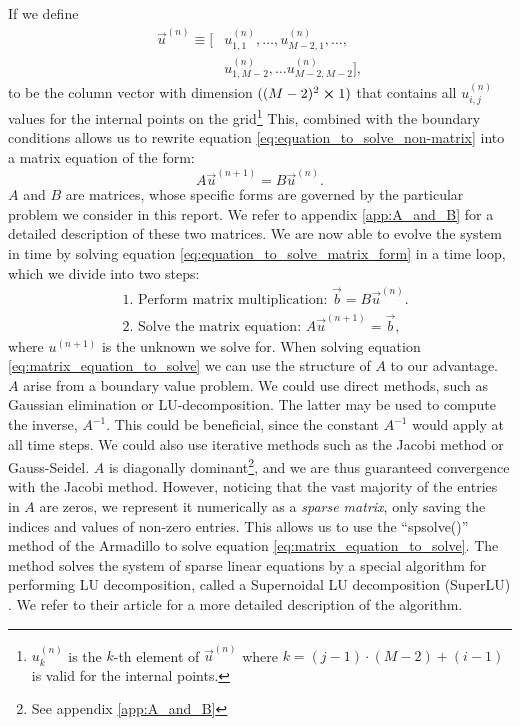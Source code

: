         If we define 
        \begin{equation}
            \begin{split}
                \vec{u}^{(n)} \equiv [&u_{1,1}^{(n)}, \dots, u_{M-2,1}^{(n)}, \dots, \\ 
                &u_{1,M-2}^{(n)}, \dots u_{M-2, M-2}^{(n)}],
            \end{split}
        \end{equation}
        to be the column vector with dimension $((M-2)^2 \cross 1)$ that contains all $u_{i,j}^{(n)}$ values for the internal points on the grid\footnote{$u_k^{(n)}$ is the $k$-th element of $\vec{u}^{(n)}$ where $k=(j-1)\cdot(M-2) + (i-1)$ is valid for the internal points.}  This, combined with the boundary conditions allows us to rewrite equation \eqref{eq:equation_to_solve_non-matrix} into a matrix equation of the form:
        \begin{equation}\label{eq:equation_to_solve_matrix_form}
            A\vec{u}^{(n+1)} = B\vec{u}^{(n)}.
        \end{equation}
        $A$ and $B$ are matrices, whose specific forms are governed by the particular problem we consider in this report. We refer to appendix \ref{app:A_and_B} for a detailed description of these two matrices.
        We are now able to evolve the system in time by solving equation \eqref{eq:equation_to_solve_matrix_form} in a time loop, which we divide into two steps:
        \begin{equation}\label{eq:matrix_equation_to_solve}
            \begin{split}
                &\text{1. Perform matrix multiplication: } \vec{b} = B\vec{u}^{(n)}. \\
                &\text{2. Solve the matrix equation: } A\vec{u}^{(n+1)} = \vec{b},
            \end{split}
        \end{equation}
        where $u^{(n+1)}$ is the unknown we solve for. When solving equation \eqref{eq:matrix_equation_to_solve} we can use the structure of $A$ to our advantage. $A$ arise from a boundary value problem. We could use direct methods, such as Gaussian elimination or LU-decomposition. The latter may be used to compute the inverse, $A^{-1}$. This could be beneficial, since the constant $A^{-1}$ would apply at all time steps. We could also use iterative methods such as the Jacobi method or Gauss-Seidel. $A$ is diagonally dominant\footnote{See appendix \ref{app:A_and_B}}, and we are thus guaranteed convergence with the Jacobi method\citep{lecture_notes}. However, noticing that the vast majority of the entries in $A$ are zeros, we represent it numerically as a \textit{sparse matrix}, only saving the indices and values of non-zero entries. This allows us to use the ``spsolve()'' method of the Armadillo to solve equation \eqref{eq:matrix_equation_to_solve}. The method solves the system of sparse linear equations by a special algorithm for performing LU decomposition, called a Supernoidal LU decomposition (SuperLU) \cite{SuperLU}. We refer to their article for a more detailed description of the algorithm.  
        
